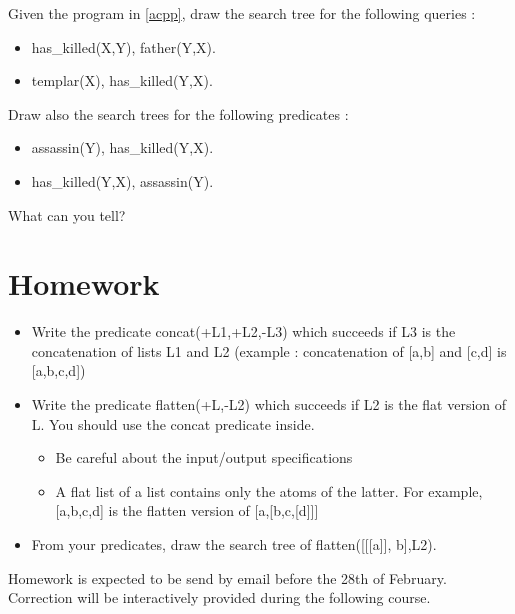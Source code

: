 \documentclass[11pt,a4paper,BCOR12mm, headexclude, footexclude, twoside, openright]{scrartcl}
\numberwithin{equation}{section} %
\numberwithin{figure}{section} %
\numberwithin{table}{section} %
\begin{document}
Given the program in \ref{acpp}, draw the search tree for the following queries : 
\begin{itemize}
	\item has\_killed(X,Y), father(Y,X).
    \item templar(X), has\_killed(Y,X). 
\end{itemize}

Draw also the search trees for the following predicates :

\begin{itemize}
\item assassin(Y), has\_killed(Y,X).
\item has\_killed(Y,X), assassin(Y).
\end{itemize}

What can you tell?

\section{Homework}

	\begin{itemize}
    	\item Write the predicate concat(+L1,+L2,-L3) which succeeds if L3 is the concatenation of lists L1 and L2 (example : concatenation of [a,b] and [c,d] is [a,b,c,d])
    	\item Write the predicate flatten(+L,-L2) which succeeds if L2 is the flat version of L. You should use the concat predicate inside.
        \begin{itemize}
        	\item Be careful about the input/output specifications
            \item A flat list of a list contains only the atoms of the latter. For example, [a,b,c,d] is the flatten version of [a,[b,c,[d]]]
        \end{itemize}
        \item From your predicates, draw the search tree of flatten([[[a]], b],L2).
    \end{itemize}
    
    Homework is expected to be send by email before the 28th of February. Correction will be interactively provided during the following course.

\appendix
\end{document}
